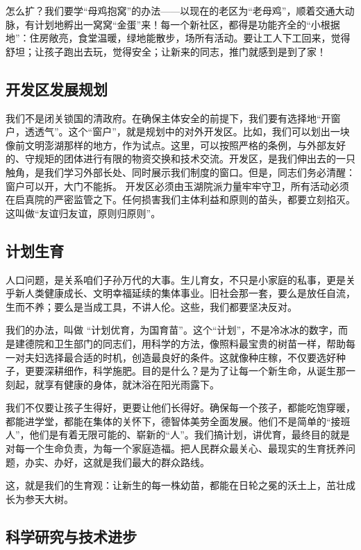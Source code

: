 怎么扩？我们要学``母鸡抱窝''的办法------以现在的老区为``老母鸡''，顺着交通大动脉，有计划地孵出一窝窝``金蛋''来！每一个新社区，都得是功能齐全的``小根据地''：住房敞亮，食堂温暖，绿地能散步，场所有活动。要让工人下工回来，觉得舒坦；让孩子跑出去玩，觉得安全；让新来的同志，推门就感到是到了家！

\subsection{开发区发展规划}\label{ux5f00ux53d1ux533aux53d1ux5c55ux89c4ux5212}

我们不是闭关锁国的清政府。在确保主体安全的前提下，我们要有选择地``开窗户，透透气''。这个``窗户''，就是规划中的对外开发区。比如，我们可以划出一块像前文明澎湖那样的地方，作为试点。这里，可以按照严格的条例，与外部友好的、守规矩的团体进行有限的物资交换和技术交流。开发区，是我们伸出去的一只触角，是我们学习外部长处、同时展示我们制度的窗口。但是，同志们务必清醒：窗户可以开，大门不能拆。 开发区必须由玉湖院派力量牢牢守卫，所有活动必须在启真院的严密监管之下。任何损害我们主体利益和原则的苗头，都要立刻掐灭。这叫做``友谊归友谊，原则归原则''。

\subsection{计划生育}\label{ux8ba1ux5212ux751fux80b2}

人口问题，是关系咱们子孙万代的大事。生儿育女，不只是小家庭的私事，更是关乎新人类健康成长、文明幸福延续的集体事业。旧社会那一套，要么是放任自流，生而不养；要么是当成工具，不讲人伦。这些，我们都要坚决反对。

我们的办法，叫做 ``计划优育，为国育苗''。这个``计划''，不是冷冰冰的数字，而是建德院和卫生部门的同志们，用科学的方法，像照料最宝贵的树苗一样，帮助每一对夫妇选择最合适的时机，创造最良好的条件。这就像种庄稼，不仅要选好种子，更要深耕细作，科学施肥。目的是什么？是为了让每一个新生命，从诞生那一刻起，就享有健康的身体，就沐浴在阳光雨露下。

我们不仅要让孩子生得好，更要让他们长得好。确保每一个孩子，都能吃饱穿暖，都能进学堂，都能在集体的关怀下，德智体美劳全面发展。他们不是简单的``接班人''，他们是有着无限可能的、崭新的``人''。我们搞计划，讲优育，最终目的就是对每一个生命负责，为每一个家庭造福。把人民群众最关心、最现实的生育抚养问题，办实、办好，这就是我们最大的群众路线。

这，就是我们的生育观：让新生的每一株幼苗，都能在日轮之冕的沃土上，茁壮成长为参天大树。

\subsection{科学研究与技术进步}\label{ux79d1ux5b66ux7814ux7a76ux4e0eux6280ux672fux8fdbux6b65}

